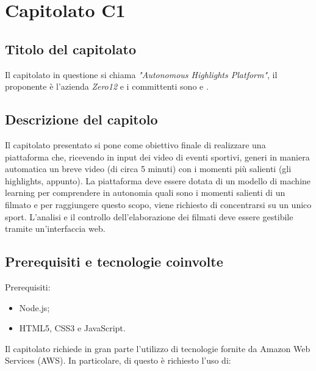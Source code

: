 \section{Capitolato C1}
\subsection{Titolo del capitolato}
Il capitolato in questione si chiama \textit{"Autonomous Highlights Platform"}, il proponente \`e l'azienda \textit{Zero12} e i committenti sono \VT{} e \CR{}.

\subsection{Descrizione del capitolo}
Il capitolato presentato si pone come obiettivo finale di realizzare una piattaforma che, ricevendo in input dei video di eventi sportivi, generi in maniera automatica un breve video (di circa 5 minuti) con i momenti più salienti (gli highlights, appunto).
La piattaforma deve essere dotata di un modello di machine learning per comprendere in autonomia quali sono i momenti salienti di un filmato e per raggiungere questo scopo, viene richiesto di concentrarsi su un unico sport.
L'analisi e il controllo dell'elaborazione dei filmati deve essere gestibile tramite un'interfaccia web.

\subsection{Prerequisiti e tecnologie coinvolte}
Prerequisiti:
\begin{itemize}
\item Node.js;
\item HTML5, CSS3 e JavaScript.
\end{itemize}
Il capitolato richiede in gran parte l'utilizzo di tecnologie fornite da Amazon Web Services (AWS).
In particolare, di questo \`e richiesto l'uso di:

